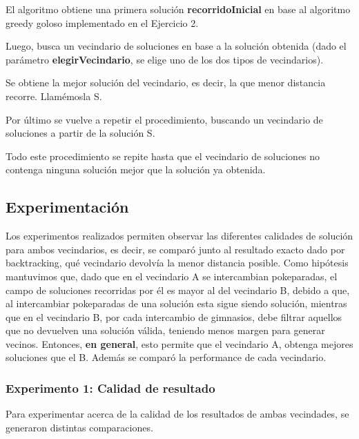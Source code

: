             El algoritmo obtiene una primera solución \textbf{recorridoInicial} en base al algoritmo greedy goloso implementado en el Ejercicio 2.
            \par Luego, busca un vecindario de soluciones en base a la solución obtenida (dado el parámetro \textbf{elegirVecindario}, se elige uno de los dos tipos de vecindarios).
            \par Se obtiene la mejor solución del vecindario, es decir, la que menor distancia recorre. Llamémosla S.
            \par Por último se vuelve a repetir el procedimiento, buscando un vecindario de soluciones a partir de la solución S.

            \par Todo este procedimiento se repite hasta que el vecindario de soluciones no contenga ninguna solución mejor que la solución ya obtenida.


    \subsection{Experimentación}
    Los experimentos realizados permiten observar las diferentes calidades de solución para ambos vecindarios, es decir, se comparó junto al resultado exacto dado por backtracking, qué vecindario devolvía la menor distancia posible. Como hipótesis mantuvimos que, dado que en el vecindario A se intercambian pokeparadas, el campo de soluciones recorridas por él es mayor al del vecindario B, debido a que, al intercambiar pokeparadas de una solución esta sigue siendo solución, mientras que en el vecindario B, por cada intercambio de gimnasios, debe filtrar aquellos que no devuelven una solución válida, teniendo menos margen para generar vecinos. Entonces, \textbf{en general}, esto permite que el vecindario A, obtenga mejores soluciones que el B. Además se comparó la performance de cada vecindario.

        \subsubsection{Experimento 1: Calidad de resultado} 
            Para experimentar acerca de la calidad de los resultados de ambas vecindades, se generaron distintas comparaciones. 

